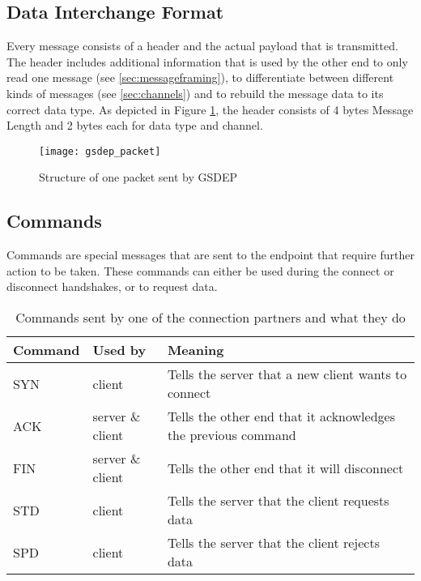 \subsection{Data Interchange Format}

Every message consists of a header and the actual payload that is transmitted. The header includes additional information that is used by the other end to only read one message (see \ref{sec:messageframing}), to differentiate between different kinds of messages (see \ref{sec:channels}) and to rebuild the message data to its correct data type. As depicted in Figure \ref{fig:packet}, the header consists of 4 bytes Message Length and 2 bytes each for data type and channel.

\begin{figure}[H]
	\centering
	\texttt{[image: gsdep\_packet]}
	\caption{Structure of one packet sent by GSDEP}
	\label{fig:packet}
\end{figure}

\subsection{Commands}

Commands are special messages that are sent to the endpoint that require further action to be taken. These commands can either be used during the connect or disconnect handshakes, or to request data.

\begin{table}[H]
	\centering
	\begin{tabular}{| l | l | p{5cm} |}
	\hline
	\textbf{Command} & \textbf{Used by} & \textbf{Meaning} \\ \hline
	SYN & client & Tells the server that a new client wants to connect \\ \hline
	ACK & server \& client & Tells the other end that it acknowledges the previous command \\ \hline
	FIN & server \& client & Tells the other end that it will disconnect \\ \hline
	STD & client & Tells the server that the client requests data\\ \hline
	SPD & client & Tells the server that the client rejects data\\
	\hline
	\end{tabular}
	\caption{Commands sent by one of the connection partners and what they do}
	\label{tab:commands}
\end{table}

